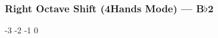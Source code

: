 \subsubsection[Right Octave Shift (4Hands Mode)]{Right Octave Shift (4Hands Mode) --- \UiKey{\SET}B$\flat$2}






































-3
-2
-1
0

